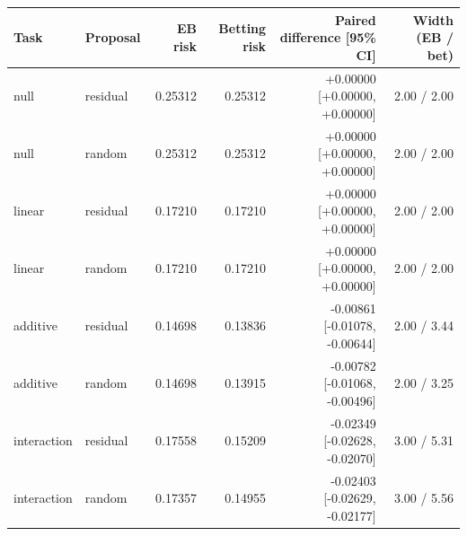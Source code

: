 \begin{tabular}{llrrrr}
\toprule
Task & Proposal & EB risk & Betting risk & Paired difference [95\% CI] & Width (EB / bet)\\
\midrule
null & residual & 0.25312 & 0.25312 & +0.00000 [+0.00000, +0.00000] & 2.00 / 2.00\\
null & random & 0.25312 & 0.25312 & +0.00000 [+0.00000, +0.00000] & 2.00 / 2.00\\
linear & residual & 0.17210 & 0.17210 & +0.00000 [+0.00000, +0.00000] & 2.00 / 2.00\\
linear & random & 0.17210 & 0.17210 & +0.00000 [+0.00000, +0.00000] & 2.00 / 2.00\\
additive & residual & 0.14698 & 0.13836 & -0.00861 [-0.01078, -0.00644] & 2.00 / 3.44\\
additive & random & 0.14698 & 0.13915 & -0.00782 [-0.01068, -0.00496] & 2.00 / 3.25\\
interaction & residual & 0.17558 & 0.15209 & -0.02349 [-0.02628, -0.02070] & 3.00 / 5.31\\
interaction & random & 0.17357 & 0.14955 & -0.02403 [-0.02629, -0.02177] & 3.00 / 5.56\\
\bottomrule
\end{tabular}
